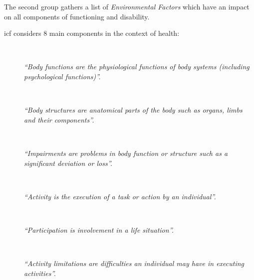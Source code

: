 The second group gathers a list of \textit{Environmental Factors} which have an 
impact on all components of functioning and disability.

\ac{icf} considers 8 main components in the context of health:

\begin{description}
  \item[] \hfill \\
    \begin{mdframed}[hidealllines=true,backgroundcolor=gray!20]
    \textit{``Body functions are the physiological functions of body systems (including
    psychological functions)''.}
    \end{mdframed}
% 
  \item[] \hfill \\
    \begin{mdframed}[hidealllines=true,backgroundcolor=gray!20]
    \textit{``Body structures are anatomical parts of the body such as organs, 
    limbs and their components''.}
    \end{mdframed}
    
  \item[] \hfill \\
    \begin{mdframed}[hidealllines=true,backgroundcolor=gray!20]
    \textit{``Impairments are problems in body function or structure such as a 
    significant deviation or loss''.}
    \end{mdframed}

  \item[] \hfill \\
    \begin{mdframed}[hidealllines=true,backgroundcolor=gray!20]
    \textit{``Activity is the execution of a task or action by an individual''.}
    \end{mdframed}

  \item[] \hfill \\
    \begin{mdframed}[hidealllines=true,backgroundcolor=gray!20]
    \textit{``Participation is involvement in a life situation''.}
    \end{mdframed}

  \item[] \hfill \\
    \begin{mdframed}[hidealllines=true,backgroundcolor=gray!20]
    \textit{``Activity limitations are difficulties an individual may have in 
    executing activities''.}
    \end{mdframed} 
    

\end{description}
